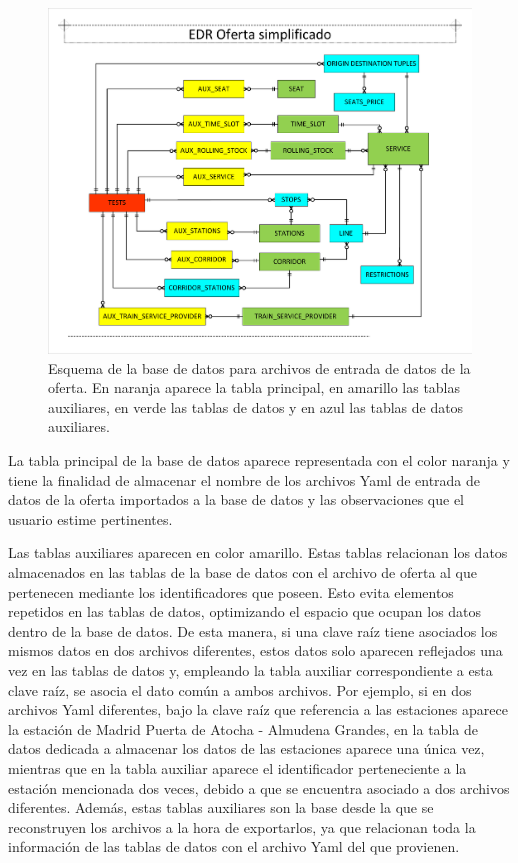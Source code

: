 \begin{figure}[H]
\centering
\includegraphics[width=.9\textwidth]{fig/Bases de datos/EDR oferta simplificado.pdf}
\caption{Esquema de la base de datos para archivos de entrada de datos de la oferta. En naranja aparece la tabla principal, en amarillo las tablas auxiliares, en verde las tablas de datos y en azul las tablas de datos auxiliares.}
\label{fig:edrOfertaSimplificado}
\end{figure}

La tabla principal de la base de datos aparece representada con el color naranja y tiene la finalidad de almacenar el nombre de los archivos \acrshort{Yaml} de entrada de datos de la oferta importados a la base de datos y las observaciones que el usuario estime pertinentes.

Las tablas auxiliares aparecen en color amarillo. Estas tablas relacionan los datos almacenados en las tablas de la base de datos con el archivo de oferta al que pertenecen mediante los identificadores que poseen. Esto evita elementos repetidos en las tablas de datos, optimizando el espacio que ocupan los datos dentro de la base de datos. De esta manera, si una clave raíz tiene asociados los mismos datos en dos archivos diferentes, estos datos solo aparecen reflejados una vez en las tablas de datos y, empleando la tabla auxiliar correspondiente a esta clave raíz, se asocia el dato común a ambos archivos. Por ejemplo, si en dos archivos \acrshort{Yaml} diferentes, bajo la clave raíz que referencia a las estaciones aparece la estación de Madrid Puerta de Atocha - Almudena Grandes, en la tabla de datos dedicada a almacenar los datos de las estaciones aparece una única vez, mientras que en la tabla auxiliar aparece el identificador perteneciente a la estación mencionada dos veces, debido a que se encuentra asociado a dos archivos diferentes. Además, estas tablas auxiliares son la base desde la que se reconstruyen los archivos a la hora de exportarlos, ya que relacionan toda la información de las tablas de datos con el archivo \acrshort{Yaml} del que provienen.

